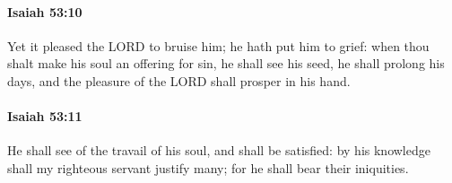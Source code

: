 		\paragraph{Isaiah 53:10} %
			\label{ISAIAH-53-10}

			Yet it pleased the LORD to bruise him; he hath put him to grief: when thou shalt make his soul an offering for sin, he shall see his seed, he shall prolong his days, and the pleasure of the LORD shall prosper in his hand.


		\paragraph{Isaiah 53:11} %
			\label{ISAIAH-53-11}

			He shall see of the travail of his soul, and shall be satisfied: by his knowledge shall my righteous servant justify many; for he shall bear their iniquities.

